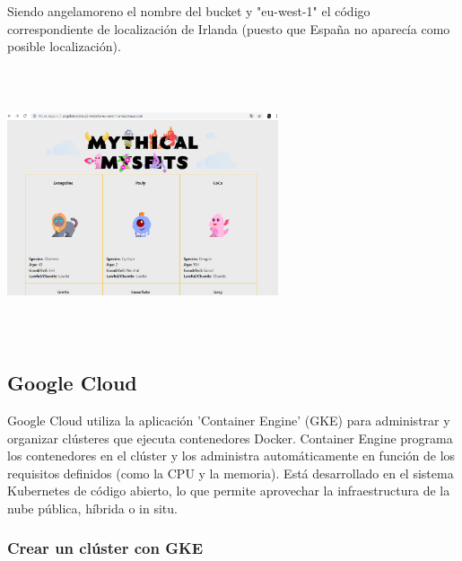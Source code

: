 \documentclass[english,runningheads,a4paper]{llncs}[2018/03/10]
\newenvironment{nscenter}
 {\parskip=0pt\par\nopagebreak\centering}
 {\par\noindent\ignorespacesafterend}
\begin{document}
Siendo angelamoreno el nombre del bucket y "eu-west-1" el código correspondiente
de localización de Irlanda (puesto que España no aparecía como posible 
localización).
\newline
\begin{nscenter}
\includegraphics[width=8cm,height=8cm,keepaspectratio]{./Contenedores/AWS/26.png}
\end{nscenter}
\newline

\newpage
\subsection*{Google Cloud}
Google Cloud utiliza la aplicación 'Container Engine' (GKE) para administrar y 
organizar clústeres que ejecuta contenedores Docker. Container Engine programa 
los contenedores en el clúster y los administra automáticamente en función de 
los requisitos definidos (como la CPU y la memoria). Está desarrollado en el 
sistema Kubernetes de código abierto, lo que permite aprovechar la 
infraestructura de la nube pública, híbrida o in situ.

\subsubsection*{Crear un clúster con GKE}
\end{document}
